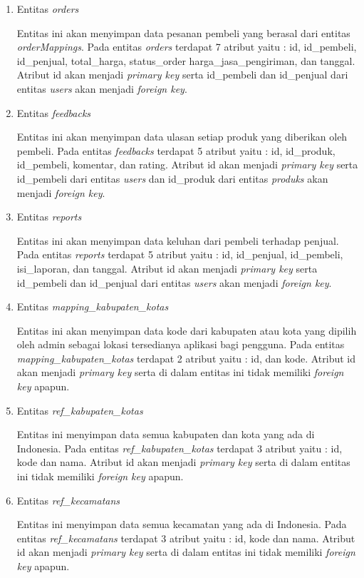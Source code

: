 \begin{enumerate}
	\item Entitas \textit{orders}
	\par Entitas ini akan menyimpan data pesanan pembeli yang berasal dari entitas \textit{orderMappings}. Pada entitas \textit{orders} terdapat 7 atribut yaitu : id, id\_pembeli, id\_penjual, total\_harga, status\_order harga\_jasa\_pengiriman, dan tanggal. Atribut id akan menjadi \textit{primary key} serta id\_pembeli dan id\_penjual dari entitas \textit{users} akan menjadi \textit{foreign key}.
	\item Entitas \textit{feedbacks}
	\par Entitas ini akan menyimpan data ulasan setiap produk yang diberikan oleh pembeli. Pada entitas \textit{feedbacks} terdapat 5 atribut yaitu : id, id\_produk, id\_pembeli, komentar, dan rating. Atribut id akan menjadi \textit{primary key} serta id\_pembeli dari entitas \textit{users} dan id\_produk dari entitas \textit{produks} akan menjadi \textit{foreign key}.
	\item Entitas \textit{reports}
	\par Entitas ini akan menyimpan data keluhan dari pembeli terhadap penjual. Pada entitas \textit{reports} terdapat 5 atribut yaitu : id, id\_penjual, id\_pembeli, isi\_laporan, dan tanggal. Atribut id akan menjadi \textit{primary key} serta id\_pembeli dan id\_penjual dari entitas \textit{users} akan menjadi \textit{foreign key}.
	\item Entitas \textit{mapping\_kabupaten\_kotas}
	\par Entitas ini akan menyimpan data kode dari kabupaten atau kota yang dipilih oleh admin sebagai lokasi tersedianya aplikasi bagi pengguna. Pada entitas \textit{mapping\_kabupaten\_kotas} terdapat 2 atribut yaitu : id, dan kode. Atribut id akan menjadi \textit{primary key} serta di dalam entitas ini tidak memiliki \textit{foreign key} apapun.
	\item Entitas \textit{ref\_kabupaten\_kotas}
	\par Entitas ini menyimpan data semua kabupaten dan kota yang ada di Indonesia. Pada entitas \textit{ref\_kabupaten\_kotas} terdapat 3 atribut yaitu : id, kode dan nama. Atribut id akan menjadi \textit{primary key} serta di dalam entitas ini tidak memiliki \textit{foreign key} apapun.
	\item Entitas \textit{ref\_kecamatans}
	\par Entitas ini menyimpan data semua kecamatan yang ada di Indonesia. Pada entitas \textit{ref\_kecamatans} terdapat 3 atribut yaitu : id, kode dan nama. Atribut id akan menjadi \textit{primary key} serta di dalam entitas ini tidak memiliki \textit{foreign key} apapun.
\end{enumerate}
	
